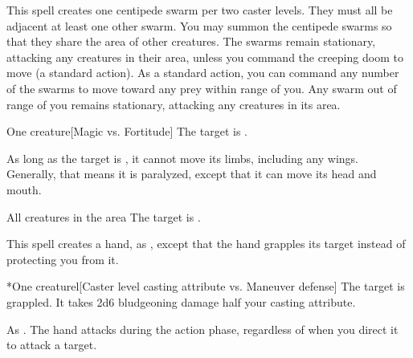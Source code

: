\spellrng{\rngmed}
\spelldur{\durmed}
\spellline
\spelleffect This spell creates one centipede swarm per two caster levels. They must all be adjacent at least one other swarm. You may summon the centipede swarms so that they share the area of other creatures. The swarms remain stationary, attacking any creatures in their area, unless you command the creeping doom to move (a standard action). As a standard action, you can command any number of the swarms to move toward any prey within range of you. Any swarm out of range of you remains stationary, attacking any creatures in its area.

\spellrng{\rngmed}
\spelldur{\durshort}
\begin{spelltarget}{One creature}[Magic vs. Fortitude]
    \spellsuccess The target is \staggered.

    As long as the target is \bloodied, it cannot move its limbs, including any wings. Generally, that means it is paralyzed, except that it can move its head and mouth.
\end{spelltarget}

\spelldur{\durmed}
\begin{spelltargets}{All creatures in the area}
    The target is \vulnerable.
\end{spelltargets}

\spellrng{\rngmed}
\spelldur{\durshort \dismissable}
\spellline
\spelleffect This spell creates a hand, as , except that the hand grapples its target instead of protecting you from it.
\begin{spelltarget}*{One creature}l[Caster level \add casting attribute vs. Maneuver defense]
    \spellsuccess The target is grappled. It takes 2d6 bludgeoning damage \add half your casting attribute.
\end{spelltarget}
\spellnotes As . The hand attacks during the action phase, regardless of when you direct it to attack a target.

